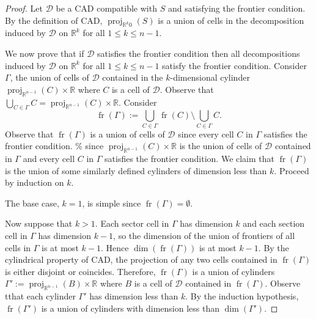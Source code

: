\documentclass[
]{book}
\theoremstyle{definition}
\theoremstyle{definition}
\theoremstyle{definition}
\theoremstyle{definition}
\theoremstyle{remark}
\begin{document}
\begin{proof}
Let \(\mathcal{D}\) be a CAD compatible with \(S\) and satisfying the frontier condition.
By the definition of CAD, \(\operatorname{proj}_{\mathbb{R}^k0}(S)\) is a union of cells in the decomposition induced by \(\mathcal{D}\) on \(\mathbb{R}^k\) for all \(1\le k \le n-1\).

We now prove that if \(\mathcal{D}\) satisfies the frontier condition then all decompositions induced by \(\mathcal{D}\) on \(\mathbb{R}^k\) for all \(1 \le k \le n-1\) satisfy the frontier condition.
Consider \(\Gamma\), the union of cells of \(\mathcal{D}\) contained in the \(k\)-dimensional cylinder \(\operatorname{proj}_{\mathbb{R}^{n-1}}(C) \times \mathbb{R}\) where \(C\) is a cell of \(\mathcal{D}\).
Observe that \(\bigcup_{C \in \Gamma} C = \operatorname{proj}_{\mathbb{R}^{n-1}}(C) \times \mathbb{R}\).
Consider \[
{\operatorname{fr} \left( \Gamma \right)} := \bigcup_{C \in \Gamma} {\operatorname{fr} \left( C \right)} \setminus \bigcup_{C \in \Gamma} C . %
\]
Observe that \({\operatorname{fr} \left( \Gamma \right)}\) is a union of cells of \(\mathcal{D}\) since every cell \(C\) in \(\Gamma\) satisfies the frontier condition. \% since \(\operatorname{proj}_{\mathbb{R}^{n-1}}(C) \times \mathbb{R}\) is the union of cells of \(\mathcal{D}\) contained in \(\Gamma\) and every cell \(C\) in \(\Gamma\) satisfies the frontier condition.
We claim that \({\operatorname{fr} \left( \Gamma \right)}\) is the union of some similarly defined cylinders of dimension less than \(k\).
Proceed by induction on \(k\).

The base case, \(k=1\), is simple since \({\operatorname{fr} \left( \Gamma \right)} = \emptyset\).

Now suppose that \(k>1\). Each sector cell in \(\Gamma\) has dimension \(k\) and each section cell in \(\Gamma\) has dimension \(k-1\), so the dimension of the union of frontiers of all cells in \(\Gamma\) is at most \(k-1\).
Hence \(\dim({\operatorname{fr} \left( \Gamma \right)})\) is at most \(k-1\).
By the cylindrical property of CAD, the projection of any two cells contained in \({\operatorname{fr} \left( \Gamma \right)}\) is either disjoint or coincides. Therefore, \({\operatorname{fr} \left( \Gamma \right)}\) is a union of cylinders \(\Gamma' := \operatorname{proj}_{\mathbb{R}^{n-1}}(B) \times \mathbb{R}\) where \(B\) is a cell of \(\mathcal{D}\) contained in \({\operatorname{fr} \left( \Gamma \right)}\). Observe tthat each cylinder \(\Gamma'\) has dimension less than \(k\).
By the induction hypothesis, \({\operatorname{fr} \left( \Gamma' \right)}\) is a union of cylinders with dimension less than \(\dim(\Gamma')\).


\end{proof}
\end{document}
